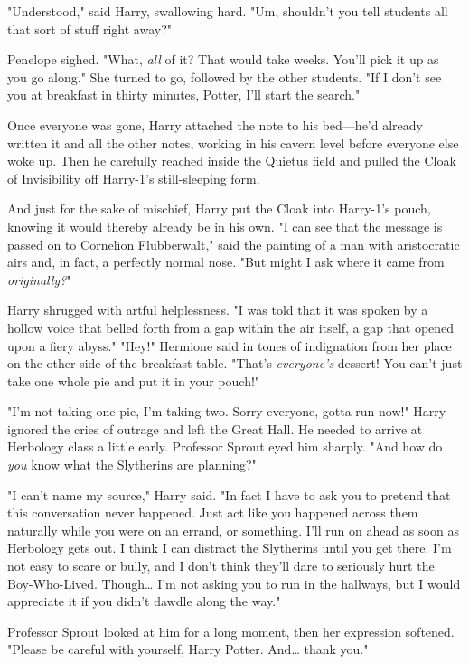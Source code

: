 "Understood," said Harry, swallowing hard. "Um, shouldn't you tell students all
that sort of stuff right away?"

Penelope sighed. "What, \emph{all} of it? That would take weeks. You'll pick it
up as you go along." She turned to go, followed by the other students. "If I
don't see you at breakfast in thirty minutes, Potter, I'll start the search."

Once everyone was gone, Harry attached the note to his bed---he'd already
written it and all the other notes, working in his cavern level before everyone
else woke up. Then he carefully reached inside the Quietus field and pulled the
Cloak of Invisibility off Harry-1's still-sleeping form.

And just for the sake of mischief, Harry put the Cloak into Harry-1's pouch,
knowing it would thereby already be in his own.
\sbreak
"I can see that the message is passed on to Cornelion Flubberwalt," said the
painting of a man with aristocratic airs and, in fact, a perfectly normal nose.
"But might I ask where it came from \emph{originally?}"

Harry shrugged with artful helplessness. "I was told that it was spoken by a
hollow voice that belled forth from a gap within the air itself, a gap that
opened upon a fiery abyss."
\sbreak
"Hey!" Hermione said in tones of indignation from her place on the other side
of the breakfast table. "That's \emph{everyone's} dessert! You can't just take
one whole pie and put it in your pouch!"

"I'm not taking one pie, I'm taking two. Sorry everyone, gotta run now!" Harry
ignored the cries of outrage and left the Great Hall. He needed to arrive at
Herbology class a little early.
\sbreak
Professor Sprout eyed him sharply. "And how do \emph{you} know what the
Slytherins are planning?"

"I can't name my source," Harry said. "In fact I have to ask you to pretend
that this conversation never happened. Just act like you happened across them
naturally while you were on an errand, or something. I'll run on ahead as soon
as Herbology gets out. I think I can distract the Slytherins until you get
there. I'm not easy to scare or bully, and I don't think they'll dare to
seriously hurt the Boy-Who-Lived. Though{\ldots} I'm not asking you to run in
the hallways, but I would appreciate it if you didn't dawdle along the way."

Professor Sprout looked at him for a long moment, then her expression softened.
"Please be careful with yourself, Harry Potter. And{\ldots} thank you."

